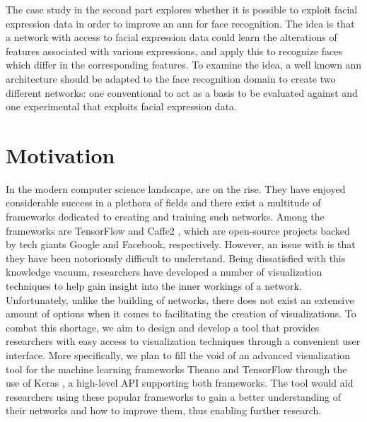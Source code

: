 \noindent The case study in the second part explores whether it is possible to exploit facial expression data in order to improve an \acrshort{ann} for face recognition. The idea is that a network with access to facial expression data could learn the alterations of features associated with various expressions, and apply this to recognize faces which differ in the corresponding features. To examine the idea, a well known \acrshort{ann} architecture should be adapted to the face recognition domain to create two different networks: one conventional to act as a basis to be evaluated against and one experimental that exploits facial expression data.\\

\section{Motivation}

\noindent In the modern computer science landscape,  are on the rise. They have enjoyed considerable success in a plethora of fields and there exist a multitude of frameworks dedicated to creating and training such networks. Among the frameworks are TensorFlow \cite{tensorflow2015-whitepaper} and Caffe2 \cite{caffe2}, which are open-source projects backed by tech giants Google and Facebook, respectively. However, an issue with  is that they have been notoriously difficult to understand. Being dissatisfied with this knowledge vacuum, researchers have developed a number of visualization techniques to help gain insight into the inner workings of a network. Unfortunately, unlike the building of networks, there does not exist an extensive amount of options when it comes to facilitating the creation of visualizations. To combat this shortage, we aim to design and develop a tool that provides researchers with easy access to visualization techniques through a convenient user interface. More specifically, we plan to fill the void of an advanced visualization tool for the machine learning frameworks Theano \cite{theano} and TensorFlow through the use of Keras \cite{chollet2015keras}, a high-level API supporting both frameworks. The tool would aid researchers using these popular frameworks to gain a better understanding of their networks and how to improve them, thus enabling further research. \\

